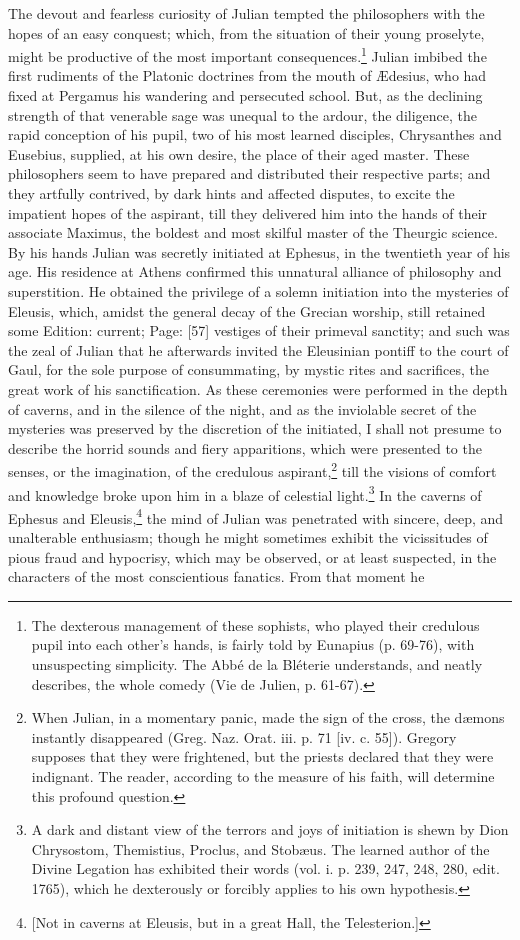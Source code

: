 The devout and fearless curiosity of Julian tempted the philosophers with the hopes of an easy conquest; which, from the situation of their young proselyte, might be productive of the most important consequences.\footnote{The dexterous management of these sophists, who played their credulous pupil into each other\texthebrew{}’s hands, is fairly told by Eunapius (p. 69-76), with unsuspecting simplicity. The Abbé de la Bléterie understands, and neatly describes, the whole comedy (Vie de Julien, p. 61-67).} Julian imbibed the first rudiments of the Platonic doctrines from the mouth of Ædesius, who had fixed at Pergamus his wandering and persecuted school. But, as the declining strength of that venerable sage was unequal to the ardour, the diligence, the rapid conception of his pupil, two of his most learned disciples, Chrysanthes and Eusebius, supplied, at his own desire, the place of their aged master. These philosophers seem to have prepared and distributed their respective parts; and they artfully contrived, by dark hints and affected disputes, to excite the impatient hopes of the aspirant, till they delivered him into the hands of their associate Maximus, the boldest and most skilful master of the Theurgic science. By his hands Julian was secretly initiated at Ephesus, in the twentieth year of his age. His residence at Athens confirmed this unnatural alliance of philosophy and superstition. He obtained the privilege of a solemn initiation into the mysteries of Eleusis, which, amidst the general decay of the Grecian worship, still retained some Edition: current; Page: [57] vestiges of their primeval sanctity; and such was the zeal of Julian that he afterwards invited the Eleusinian pontiff to the court of Gaul, for the sole purpose of consummating, by mystic rites and sacrifices, the great work of his sanctification. As these ceremonies were performed in the depth of caverns, and in the silence of the night, and as the inviolable secret of the mysteries was preserved by the discretion of the initiated, I shall not presume to describe the horrid sounds and fiery apparitions, which were presented to the senses, or the imagination, of the credulous aspirant,\footnote{When Julian, in a momentary panic, made the sign of the cross, the dæmons instantly disappeared (Greg. Naz. Orat. iii. p. 71 [iv. c. 55]). Gregory supposes that they were frightened, but the priests declared that they were indignant. The reader, according to the measure of his faith, will determine this profound question.} till the visions of comfort and knowledge broke upon him in a blaze of celestial light.\footnote{A dark and distant view of the terrors and joys of initiation is shewn by Dion Chrysostom, Themistius, Proclus, and Stobæus. The learned author of the Divine Legation has exhibited their words (vol. i. p. 239, 247, 248, 280, edit. 1765), which he dexterously or forcibly applies to his own hypothesis.} In the caverns of Ephesus and Eleusis,\footnote{[Not in caverns at Eleusis, but in a great Hall, the Telesterion.]} the mind of Julian was penetrated with sincere, deep, and unalterable enthusiasm; though he might sometimes exhibit the vicissitudes of pious fraud and hypocrisy, which may be observed, or at least suspected, in the characters of the most conscientious fanatics. From that moment he 
